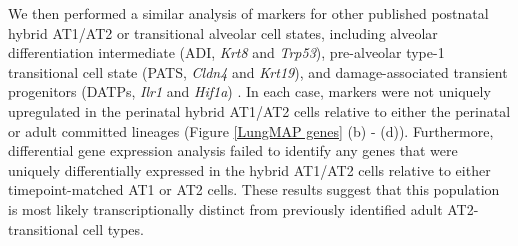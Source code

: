 \documentclass[aps,superscriptaddress, notitlepage,longbibliography]{revtex4-1}
\begin{document}
We then performed a similar analysis of markers for other published postnatal hybrid AT1/AT2 or transitional alveolar cell states, including alveolar differentiation intermediate (ADI, {\it Krt8} and {\it Trp53}), pre-alveolar type-1 transitional cell state (PATS, {\it Cldn4} and {\it Krt19}), and damage-associated transient progenitors (DATPs, {\it Ilr1} and {\it Hif1a}) \cite{verheyden2020transitional, strunz2020alveolar, kobayashi2020persistence, choi2020inflammatory}. In each case, markers were not uniquely upregulated in the perinatal hybrid AT1/AT2 cells relative to either the perinatal or adult committed lineages (Figure \ref{LungMAP genes} (b) - (d)). Furthermore, differential gene expression analysis failed to identify any genes that were uniquely differentially expressed in the hybrid AT1/AT2 cells relative to either timepoint-matched AT1 or AT2 cells. These results suggest that this population is most likely transcriptionally distinct from previously identified adult AT2-transitional cell types. 
\end{document}
